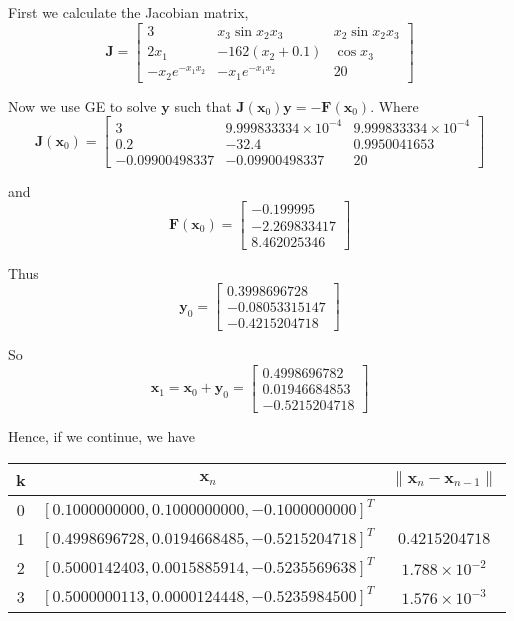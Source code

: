\begin{solution}
	First we calculate the Jacobian matrix, 
	\[ \mathbf{J} = \begin{bmatrix}
	3 & x_3\sin x_2x_3 & x_2\sin x_2x_3\\
	2x_1 & -162(x_2+0.1) & \cos x_3\\
	-x_2e^{-x_1x_2} & -x_1e^{-x_1x_2} & 20
	\end{bmatrix} \]
	
	Now we use GE to solve $\mathbf{y}$ such that $\mathbf{J}(\mathbf{x}_0)\mathbf{y} = - \mathbf{F}(\mathbf{x}_0)$. Where
	\[ \mathbf{J}(\mathbf{x}_0) = \begin{bmatrix}
	3 & 9.999833334\times 10^{-4} & 9.999833334\times 10^{-4}\\
	0.2 & -32.4 & 0.9950041653\\
	-0.09900498337 & -0.09900498337 & 20
	\end{bmatrix} \]
	
	and 
	\[ \mathbf{F}(\mathbf{x}_0) = \begin{bmatrix}
	-0.199995\\ -2.269833417\\ 8.462025346
	\end{bmatrix} \]
	
	Thus 
	\[ \mathbf{y}_0 = \begin{bmatrix}
	0.3998696728 \\ -0.08053315147 \\-0.4215204718
	\end{bmatrix} \]
	
	So 
	\[ \mathbf{x}_1 = \mathbf{x}_0 + \mathbf{y}_0 
	=  \begin{bmatrix}
	0.4998696782\\ 0.01946684853\\ -0.5215204718
	\end{bmatrix} \]
	
	Hence, if we continue, we have
	
	\begin{tabular}{|c|c|c|}
		\hline 
		k & $\mathbf{x}_n$ & $\| \mathbf{x}_n - \mathbf{x}_{n-1} \|$ \\ 
		\hline 
		0 & $[0.1000000000, 0.1000000000, -0.1000000000]^T$ &  \\ 
		\hline 
		1 & $[0.4998696728, 0.0194668485, -0.5215204718]^T$ & $0.4215204718$ \\ 
		\hline 
		2 & $[0.5000142403, 0.0015885914, -0.5235569638]^T$ & $1.788\times10^{-2}$ \\ 
		\hline 
		3 & $[0.5000000113, 0.0000124448, -0.5235984500]^T$ & $1.576 \times 10^{-3}$ \\ 
		\hline 
	\end{tabular}  
\end{solution}

